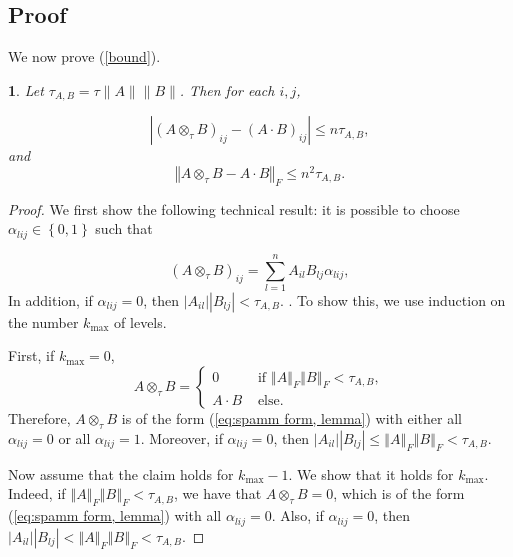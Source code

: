 \documentclass[letterpaper,twocolumn,amsmath,amsfont,amssymb,english,aps,jcp,preprintnumbers,groupaddress,nofootinbib,tightenlines,floatfix]{revtex4}
\theoremstyle{plain}
\theoremstyle{remark}
\theoremstyle{plain}
\newtheorem{prop}[thm]{\protect\propositionname}
\providecommand{\propositionname}{Proposition}
\begin{document}
\subsection{Proof}

We now prove (\ref{bound}).

\begin{prop}
\label{lem:SpAMM mult, prop}
Let $\tau_{A,B} = \tau \| A \| \| B \| $. Then for each $i,j$,

\[
\left|\left(A\otimes_{\tau}B\right)_{ij}-\left(A\cdot B\right)_{ij}\right|\leq n\tau_{A,B},
\]
and
\[
\left\Vert A\otimes_{\tau}B-A\cdot B\right\Vert _{F}\leq n^{2}\tau_{A,B}.
\]
\end{prop}



\begin{proof}


We first show the following technical result: it is possible to choose $\alpha_{lij}\in\left\{ 0,1\right\} $ such that 

\begin{equation}
\left(A\otimes_{\tau}B\right)_{ij}=\sum_{l=1}^{n}A_{il}B_{lj}\alpha_{lij},\label{eq:spamm form, lemma}
\end{equation}
In addition, if $\alpha_{lij}=0$, then \textup{$\left|A_{il}\right|\left|B_{lj}\right|<\tau_{A,B}$. }. To show this, we use 
induction on the number $k_{\max}$ of levels. 

First, if $k_{\max}=0$,
\[
A\otimes_{\tau}B=\begin{cases}
0 & \,\,\text{if}\,\,\left\Vert A\right\Vert _{F}\left\Vert B\right\Vert _{F}<\tau_{A,B},\\
A\cdot B & \,\,\text{else}.
\end{cases}
\]
Therefore, $A\otimes_{\tau}B$ is of the form (\ref{eq:spamm form, lemma})
with either all $\alpha_{lij}=0$ or all $\alpha_{lij}=1$. Moreover,
if $\alpha_{lij}=0$, then $\left|A_{il}\right|\left|B_{lj}\right|\leq\left\Vert A\right\Vert _{F}\left\Vert B\right\Vert _{F}<\tau_{A,B}$. 

Now assume that the claim holds for $k_{\max}-1$. We show that it
holds for $k_{\max}$. Indeed, if $\left\Vert A\right\Vert _{F}\left\Vert B\right\Vert _{F}<\tau_{A,B}$,
we have that $A\otimes_{\tau}B=0$, which is of the form (\ref{eq:spamm form, lemma})
with all $\alpha_{lij}=0$. Also, if $\alpha_{lij}=0$, then $\left|A_{il}\right|\left|B_{lj}\right|<\left\Vert A\right\Vert _{F}\left\Vert B\right\Vert _{F}<\tau_{A,B}$.


\end{proof}
\end{document}
